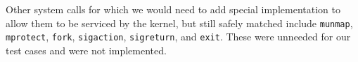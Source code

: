 Other system calls for which we would need to add special implementation
to allow them to be serviced by the kernel, but still safely matched include
\texttt{munmap}, \texttt{mprotect}, \texttt{fork}, \texttt{sigaction},
\texttt{sigreturn}, and \texttt{exit}. These were unneeded for our test cases
and were not implemented.

